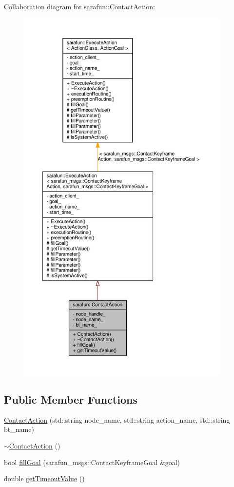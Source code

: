 Collaboration diagram for sarafun\-:\-:Contact\-Action\-:\nopagebreak
\begin{figure}[H]
\begin{center}
\leavevmode
\includegraphics[height=550pt]{d3/d7e/classsarafun_1_1ContactAction__coll__graph}
\end{center}
\end{figure}
\subsection*{Public Member Functions}
\begin{DoxyCompactItemize}
\item 
\hyperlink{classsarafun_1_1ContactAction_a8374da0d20d05fe01b86f2090b2c1770_a8374da0d20d05fe01b86f2090b2c1770}{Contact\-Action} (std\-::string node\-\_\-name, std\-::string action\-\_\-name, std\-::string bt\-\_\-name)
\item 
\hyperlink{classsarafun_1_1ContactAction_a22429fcb44fbe815f745b4924ed08f34_a22429fcb44fbe815f745b4924ed08f34}{$\sim$\-Contact\-Action} ()
\item 
bool \hyperlink{classsarafun_1_1ContactAction_a563907411debe223088ef5a34d8c0fb0_a563907411debe223088ef5a34d8c0fb0}{fill\-Goal} (sarafun\-\_\-msgs\-::\-Contact\-Keyframe\-Goal \&goal)
\item 
double \hyperlink{classsarafun_1_1ContactAction_a85d81232d228fc6d2856d318d25c1bf9_a85d81232d228fc6d2856d318d25c1bf9}{get\-Timeout\-Value} ()
\end{DoxyCompactItemize}
